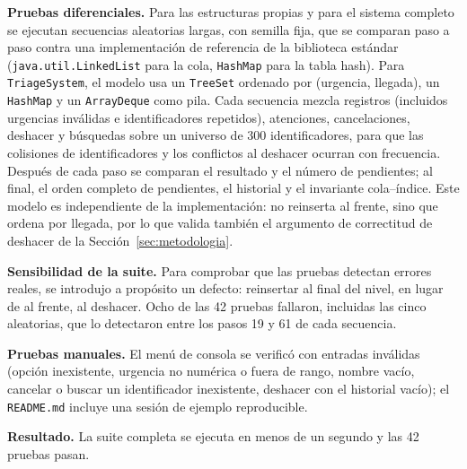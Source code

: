 \textbf{Pruebas diferenciales.} Para las estructuras propias y para el
sistema completo se ejecutan secuencias aleatorias largas, con semilla fija,
que se comparan paso a paso contra una implementación de referencia de la
biblioteca estándar (\texttt{java.util.LinkedList} para la cola,
\texttt{HashMap} para la tabla hash). Para \texttt{TriageSystem}, el modelo
usa un \texttt{TreeSet} ordenado por (urgencia, llegada), un
\texttt{HashMap} y un \texttt{ArrayDeque} como pila. Cada secuencia mezcla
registros (incluidos urgencias inválidas e identificadores repetidos),
atenciones, cancelaciones, deshacer y búsquedas sobre un universo de 300
identificadores, para que las colisiones de identificadores y los
conflictos al deshacer ocurran con frecuencia. Después de cada paso se
comparan el resultado y el número de pendientes; al final, el orden
completo de pendientes, el historial y el invariante cola--índice.
Este modelo es independiente de la implementación: no reinserta al frente,
sino que ordena por llegada, por lo que valida también el argumento de
correctitud de deshacer de la Sección~\ref{sec:metodologia}.

\textbf{Sensibilidad de la suite.} Para comprobar que las pruebas detectan
errores reales, se introdujo a propósito un defecto: reinsertar al final
del nivel, en lugar de al frente, al deshacer. Ocho de las 42 pruebas
fallaron, incluidas las cinco aleatorias, que lo detectaron entre los pasos
19 y 61 de cada secuencia.

\textbf{Pruebas manuales.} El menú de consola se verificó con entradas
inválidas (opción inexistente, urgencia no numérica o fuera de rango,
nombre vacío, cancelar o buscar un identificador inexistente, deshacer con
el historial vacío); el \texttt{README.md} incluye una sesión de ejemplo
reproducible.

\textbf{Resultado.} La suite completa se ejecuta en menos de un segundo y
las 42 pruebas pasan.
